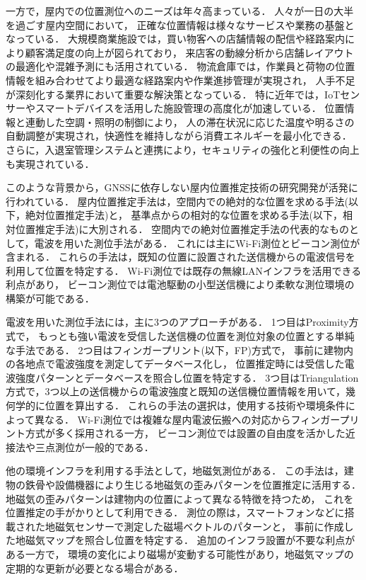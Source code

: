 一方で，屋内での位置測位へのニーズは年々高まっている．
人々が一日の大半を過ごす屋内空間において，
正確な位置情報は様々なサービスや業務の基盤となっている．
大規模商業施設では，買い物客への店舗情報の配信や経路案内により顧客満足度の向上が図られており\cite{burasapo}，
来店客の動線分析から店舗レイアウトの最適化や混雑予測にも活用されている．
物流倉庫では，作業員と荷物の位置情報を組み合わせてより最適な経路案内や作業進捗管理が実現され，
人手不足が深刻化する業界において重要な解決策となっている．
特に近年では，IoTセンサーやスマートデバイスを活用した施設管理の高度化が加速している．
位置情報と連動した空調・照明の制御により，
人の滞在状況に応じた温度や明るさの自動調整が実現され，快適性を維持しながら消費エネルギーを最小化できる．
さらに，入退室管理システムと連携により，セキュリティの強化と利便性の向上も実現されている．

このような背景から，GNSSに依存しない屋内位置推定技術の研究開発が活発に行われている．
屋内位置推定手法は，空間内での絶対的な位置を求める手法(以下，絶対位置推定手法)と，
基準点からの相対的な位置を求める手法(以下，相対位置推定手法)に大別される．
空間内での絶対位置推定手法の代表的なものとして，電波を用いた測位手法がある．
これには主にWi-Fi測位とビーコン測位が含まれる．
これらの手法は，既知の位置に設置された送信機からの電波信号を利用して位置を特定する．
Wi-Fi測位では既存の無線LANインフラを活用できる利点があり，
ビーコン測位では電池駆動の小型送信機により柔軟な測位環境の構築が可能である．

電波を用いた測位手法には，主に3つのアプローチがある．
1つ目はProximity方式で，
もっとも強い電波を受信した送信機の位置を測位対象の位置とする単純な手法である．
2つ目はフィンガープリント(以下，FP)方式で，
事前に建物内の各地点で電波強度を測定してデータベース化し，
位置推定時には受信した電波強度パターンとデータベースを照合し位置を特定する．
3つ目はTriangulation方式で，3つ以上の送信機からの電波強度と既知の送信機位置情報を用いて，幾何学的に位置を算出する．
これらの手法の選択は，使用する技術や環境条件によって異なる．
Wi-Fi測位では複雑な屋内電波伝搬への対応からフィンガープリント方式が多く採用される一方，
ビーコン測位では設置の自由度を活かした近接法や三点測位が一般的である．

他の環境インフラを利用する手法として，地磁気測位がある．
この手法は，建物の鉄骨や設備機器により生じる地磁気の歪みパターンを位置推定に活用する．
地磁気の歪みパターンは建物内の位置によって異なる特徴を持つため，
これを位置推定の手がかりとして利用できる．
測位の際は，スマートフォンなどに搭載された地磁気センサーで測定した磁場ベクトルのパターンと，
事前に作成した地磁気マップを照合し位置を特定する．
追加のインフラ設置が不要な利点がある一方で，
環境の変化により磁場が変動する可能性があり，地磁気マップの定期的な更新が必要となる場合がある．

